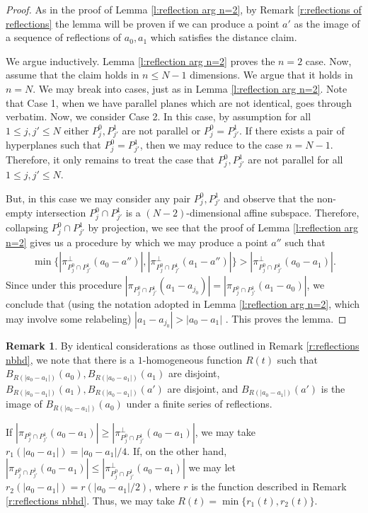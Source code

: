 \documentclass[12pt]{amsart}
\numberwithin{equation}{section}
\theoremstyle{plain}
\theoremstyle{definition}
\newtheorem{remark}[theorem]{Remark}
\begin{document}
\begin{proof}
As in the proof of Lemma \ref{l:reflection arg n=2}, by Remark \ref{r:reflections of reflections} the lemma will be proven if we can produce a point $a'$ as the image of a sequence of reflections of $a_0, a_1$ which satisfies the distance claim.

We argue inductively.  Lemma \ref{l:reflection arg n=2} proves the $n=2$ case.  Now, assume that the claim holds in $n\le N-1$ dimensions.  We argue that it holds in $n=N$.  We may break into cases, just as in Lemma \ref{l:reflection arg n=2}.  Note that Case 1, when we have parallel planes which are not identical, goes through verbatim.  Now, we consider Case 2.  In this case, by assumption for all $1\le j, j'\le N$ either $P_j^0, P_{j'}^1$ are not parallel or $P_j^0 = P_{j'}^1$. If there exists a pair of hyperplanes such that $P_j^0 = P_{j'}^1$, then we may reduce to the case $n=N-1$.  Therefore, it only remains to treat the case that $P_j^0, P_{j'}^1$ are not parallel for all $1\le j, j'\le N$.  

But, in this case we may consider any pair $P_j^0, P_{j'}^1$ and observe that the non-empty intersection $P_j^0 \cap P_{j'}^1$ is a $(N-2)$-dimensional affine subspace.  Therefore, collapsing $P_j^0 \cap P_{j'}^1$ by projection, we see that the proof of Lemma \ref{l:reflection arg n=2} gives us a procedure by which we may produce a point $a''$ such that 
\begin{align*} 
\min\{|\pi^\perp_{P_j^0 \cap P_{j'}^1}(a_0 -a'')|, |\pi^{\perp}_{P_j^0 \cap P_{j'}^1}(a_1 - a'')|\} > |\pi^{\perp}_{P_j^0 \cap P_{j'}^1}(a_0-a_1)|.
\end{align*}
Since under this procedure $|\pi_{P_j^0 \cap P_{j'}^1}(a_1 - a_{j_0})| = |\pi_{P_j^0 \cap P_{j'}^1}(a_1 - a_{0})|$, we conclude that (using the notation adopted in Lemma \ref{l:reflection arg n=2}, which may involve some relabeling) $|a_1-a_{j_0}| > |a_0-a_1|$ . This proves the lemma.
\end{proof}

\begin{remark}\label{r: nbhds remark 2}
    By identical considerations as those outlined in Remark \ref{r:reflections nbhd}, we note that there is a $1$-homogeneous function $R(t)$ such that $B_{R(|a_0 - a_1|)}(a_0), B_{R(|a_0 - a_1|)}(a_1)$ are disjoint, $B_{R(|a_0 - a_1|)}(a_1), B_{R(|a_0 - a_1|)}(a')$ are disjoint, and $B_{R(|a_0 - a_1|)}(a')$ is the image of $B_{R(|a_0 - a_1|)}(a_0)$ under a finite series of reflections. 

    If $|\pi_{P^0_j \cap P^1_{j'}}(a_0 - a_1)|\ge  |\pi^{\perp}_{P^0_j \cap P^1_{j'}}(a_0 - a_1)|$, we may take $r_1(|a_0 - a_1|) = |a_0 - a_1|/4$.  If, on the other hand, $|\pi_{P^0_j \cap P^1_{j'}}(a_0 - a_1)| \le  |\pi^{\perp}_{P^0_j \cap P^1_{j'}}(a_0 - a_1)|$ we may let $r_2(|a_0 - a_1|) = r(|a_0 - a_1|/2)$, where $r$ is the function described in Remark \ref{r:reflections nbhd}.  Thus, we may take $R(t) = \min\{r_1(t), r_2(t)\}$.
\end{remark}
\end{document}
